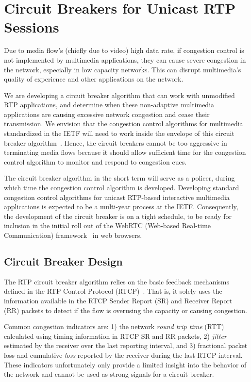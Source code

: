 \section{Circuit Breakers for Unicast RTP Sessions}

Due to media flow's (chiefly due to video) high data rate, if congestion
control is not implemented by multimedia applications, they can cause severe
congestion in the network, especially in low capacity networks. This can
disrupt multimedia's quality of experience and other applications on the
network.

We are developing a circuit breaker algorithm that can work with unmodified
RTP applications, and determine when these non-adaptive multimedia
applications are causing excessive network congestion and cease their
transmission.  We envision that the congestion control algorithms for
multimedia standardized in the IETF will need to work inside the envelope of
this circuit breaker algorithm~\cite{draft.rmcat.evaluate}. Hence, the circuit
breakers cannot be too aggressive in terminating media flows because it
should allow sufficient time for the congestion control algorithm  to monitor
and respond to congestion cues.

The circuit breaker algorithm in the short term will serve as a policer,
during which time the congestion control algorithm is developed. Developing
standard congestion control algorithms for unicast RTP-based interactive
multimedia applications is expected to be a multi-year process at the IETF.
Consequently, the development of the circuit breaker is on a tight schedule,
to be ready for inclusion in the initial roll out of the WebRTC (Web-based
Real-time Communication) framework~\cite{jennings:2013:webrtc} in web
browsers.

\subsection{Circuit Breaker Design}

The RTP circuit breaker algorithm relies on the basic feedback mechanisms
defined in the RTP Control Protocol (RTCP)~\cite{rfc3550}. That is, it solely
uses the information available in the RTCP Sender Report (SR) and Receiver
Report (RR) packets to detect if the flow is overusing the capacity or causing
congestion.

Common congestion indicators are: 1) the network \emph{round trip time} (RTT)
calculated  using timing information in RTCP SR and RR packets, 2)
\emph{jitter} estimated by the receiver over the last reporting interval, and
3) fractional packet loss and cumulative \emph{loss} reported by the receiver
during the last RTCP interval. These indicators  unfortunately only provide a
limited insight into the behavior of the network and cannot be used as strong
signals for a circuit breaker.


